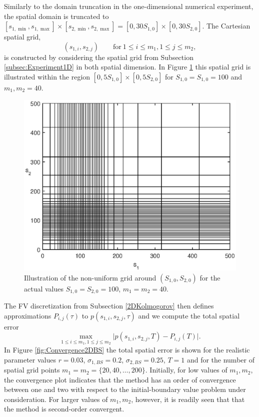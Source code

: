 \documentclass[10pt]{article}
\begin{document}
Similarly to the domain truncation in the one-dimensional numerical experiment, the spatial domain is truncated to $[s_{1,\min}, s_{1,\max}] \times [s_{2,\min}, s_{2,\max}] = [0, 30S_{1,0}] \times [0, 30S_{2,0}]$. The Cartesian spatial grid,
$$ (s_{1,i},s_{2,j}) \qquad \mathrm{for} \ 1 \le i \le m_{1}, 1 \le j \le m_{2}, $$ 
is constructed by considering the spatial grid from Subsection \ref{subsec:Experiment1D} in both spatial dimension. In Figure \ref{fig:Grid2DBS} this spatial grid is illustrated within the region  $[0, 5S_{1,0}] \times [0, 5S_{2,0}]$ for $S_{1,0} = S_{1,0} = 100$ and $m_{1}, m_{2} = 40$.
\begin{figure}
\begin{center}
\includegraphics[scale=0.5]{Grid2DBS.eps}  
\caption{Illustration of the non-uniform grid around $(S_{1,0},S_{2,0})$ for the actual values $S_{1,0}=S_{2,0}=100$, $m_{1}=m_{2}=40$.}
\label{fig:Grid2DBS}
\end{center}
\end{figure}
The FV discretization from Subsection \ref{2DKolmogorov} then defines approximations $P_{i,j}(\tau)$ to $p(s_{1,i},s_{2,j},\tau)$ and we compute the total spatial error
$$ \max_{1 \le i \le m_{1}, 1 \le j \le m_{2}} \vert p(s_{1,i},s_{2,j},T) - P_{i,j}(T) \vert. $$
In Figure \ref{fig:Convergence2DBS} the total spatial error is shown for the realistic parameter values $r= 0.03$, $\sigma_{1,BS}=0.2$, $\sigma_{2,BS}=0.25$, $T=1$ and for the number of spatial grid points $m_{1}=m_{2} = \{20,40, \ldots, 200 \}$. 
Initially, for low values of $m_{1},m_{2}$, the convergence plot indicates that the method has an order of convergence between one and two with respect to the initial-boundary value problem under consideration. For larger values of $m_{1},m_{2}$, however, it is readily seen that that the method is second-order convergent. 
\end{document}
